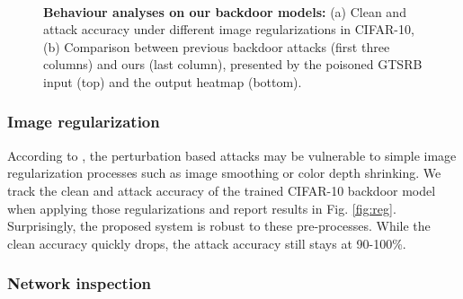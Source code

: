 \documentclass{article}
\begin{document}
\begin{figure}[t]
\centering
{}
~~
    \vspace{-1mm}
\caption{\textbf{Behaviour analyses on our backdoor models:} (a) Clean and attack accuracy under different image regularizations in CIFAR-10, (b) Comparison between previous backdoor attacks \cite{gu2017badnets,ji2019programmable,salem2020dynamic} (first three columns) and ours (last column), presented by the poisoned GTSRB input (top) and the output heatmap (bottom).}
\label{fig:behavior}
\end{figure}


\subsubsection{Image regularization}
According to \cite{xu2017feature}, the perturbation based attacks may be vulnerable to simple image regularization processes such as image smoothing or color depth shrinking. We track the clean and attack accuracy of the trained CIFAR-10 backdoor model when applying those regularizations and report results in Fig. \ref{fig:reg}. Surprisingly, the proposed system is  robust to these pre-processes. While the clean accuracy quickly drops, the attack accuracy still stays at 90-100\%. 

\subsubsection{Network inspection}
\end{document}
